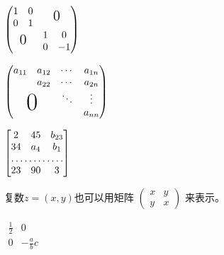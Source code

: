 \documentclass{ctexart}
\begin{document}
    $
    \begin{pmatrix}
        \begin{matrix} 
            1 & 0 \\
            0 & 1
        \end{matrix} & \text{\Large 0}\\
        \text{\Large 0} & 
        \begin{matrix}
            1 & 0\\
            0 & -1
        \end{matrix}
    \end{pmatrix}
    $

    $
    \begin{pmatrix}
        a_{11} & a_{12} & \cdots & a_{1n} \\
        & a_{22} & \cdots & a_{2n} \\
        &      & \ddots & \vdots \\
        \multicolumn{2}{c}{\raisebox{1.3ex}[0pt]{\Huge 0}} %
        &      & a_{nn}
    \end{pmatrix}
    $

    $
    \begin{bmatrix}
        2 & 45 & b_{23} \\
        34 & a_{4} & b_{1} \\
        \hdotsfor{3} \\
        23 & 90 & 3
    \end{bmatrix}
    $

    复数$z = (x,y)$也可以用矩阵
    \begin{math}
        \left (
            \begin{smallmatrix}
                x & y \\
                y & x
            \end{smallmatrix}
        \right )
    \end{math}
    来表示。

    $
    \begin{array}{r|r}
        \frac12 & 0 \\ %
        \hline 
        0 & -\frac abc \\
    \end{array}
    $
\end{document}

